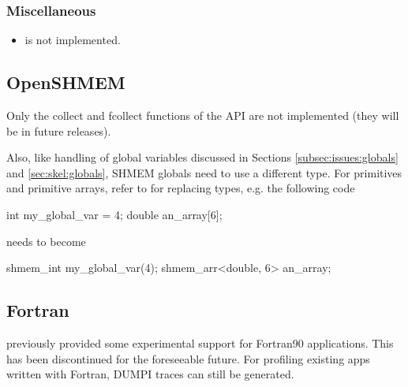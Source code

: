 \subsubsection{Miscellaneous}
\label{subsubsec:issues:mpi:misc}

\begin{itemize}
\item {} is not implemented.
\end{itemize}

\subsection{OpenSHMEM}
\label{subsec:issues:shmem}

Only the collect and fcollect functions of the API are not implemented (they will be in future releases).

Also, like handling of global variables discussed in Sections \ref{subsec:issues:globals} and \ref{sec:skel:globals}, SHMEM globals need to use a different type.  
For primitives and primitive arrays, refer to  for replacing types, e.g. the following code

\begin{ViFile}
int my_global_var = 4;
double an_array[6];
\end{ViFile}

needs to become

\begin{ViFile}
shmem_int my_global_var(4);
shmem_arr<double, 6> an_array;
\end{ViFile}


\subsection{Fortran}
\label{subsec:issues:fortran}

\sstmacro previously provided some experimental support for Fortran90 applications. 
This has been discontinued for the foreseeable future.
For profiling existing apps written with Fortran, DUMPI traces can still be generated. 

